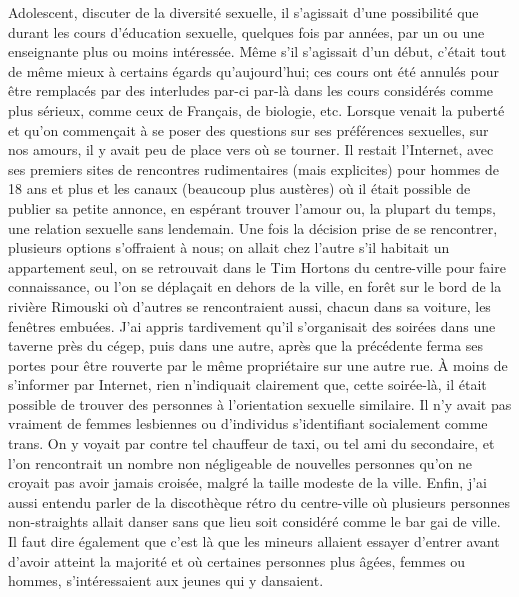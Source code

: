 Adolescent, discuter de la diversité sexuelle, il s'agissait d'une possibilité que durant les cours d'éducation sexuelle, quelques fois par années, par un ou une enseignante plus ou moins intéressée.
Même s'il s'agissait d'un début, c'était tout de même mieux à certains égards qu'aujourd'hui; ces cours ont été annulés pour être remplacés par des interludes par-ci par-là dans les cours considérés comme plus sérieux, comme ceux de Français, de biologie, etc.
Lorsque venait la puberté et qu'on commençait à se poser des questions sur ses préférences sexuelles, sur nos amours, il y avait peu de place vers où se tourner.
Il restait l'Internet, avec ses premiers sites de rencontres rudimentaires (mais explicites) pour hommes de 18 ans et plus et les canaux \irc{} (beaucoup plus austères) où il était possible de publier sa petite annonce, en espérant trouver l'amour ou, la plupart du temps, une relation sexuelle sans lendemain.
Une fois la décision prise de se rencontrer, plusieurs options s'offraient à nous; on allait chez l'autre s'il habitait un appartement seul, on se retrouvait dans le Tim Hortons du centre-ville pour faire connaissance, ou l'on se déplaçait en dehors de la ville, en forêt sur le bord de la rivière Rimouski où d'autres se rencontraient aussi, chacun dans sa voiture, les fenêtres embuées.
J'ai appris tardivement qu'il s'organisait des soirées dans une taverne près du cégep, puis dans une autre, après que la précédente ferma ses portes pour être rouverte par le même propriétaire sur une autre rue.
À moins de s'informer par Internet, rien n'indiquait clairement que, cette soirée-là, il était possible de trouver des personnes à l'orientation sexuelle similaire.
Il n'y avait pas vraiment de femmes lesbiennes ou d'individus s'identifiant socialement comme trans.
On y voyait par contre tel chauffeur de taxi, ou tel ami du secondaire, et l'on rencontrait un nombre non négligeable de nouvelles personnes qu'on ne croyait pas avoir jamais croisée, malgré la taille modeste de la ville.
Enfin, j'ai aussi entendu parler de la discothèque rétro du centre-ville où plusieurs personnes non-straights allait danser sans que lieu soit considéré comme le bar gai de ville.
Il faut dire également que c'est là que les mineurs allaient essayer d'entrer avant d'avoir atteint la majorité et où certaines personnes plus âgées, femmes ou hommes, s'intéressaient aux jeunes qui y dansaient.


